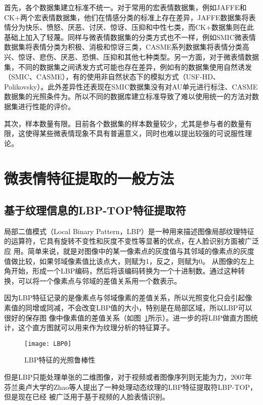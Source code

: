 首先，各个数据集建立标准不统一。对于常用的宏表情数据集，例如JAFFE和CK+两个宏表情数据集，他们在情感分类的标准上存在差异，JAFFE数据集将表情分为快乐、愤怒、厌恶、讨厌、惊讶、压抑和中性七类，而CK+数据集则在此基础上加入了轻蔑。同样与微表情数据集的分类方式也不一样，例如SMIC微表情数据集将表情分类为积极、消极和惊讶三类，CASME系列数据集将表情分类高兴、惊讶、悲伤、厌恶、恐惧、压抑和其他七种类型。另一方面，对于微表情数据集，不同的数据集之间诱发方式可能也存在差异，例如有的数据集使用自然诱发（SMIC、CASME），有的使用非自然状态下的模拟方式（USF-HD、Polikovsky）。此外差异性还表现在SMIC数据集没有对AU单元进行标注、CASME数据集的光照条件为。所以不同的数据库建立标准导致了难以使用统一的方法对数据集进行性能的评价。

其次，样本数量有限。目前各个数据集的样本数量较少，尤其是参与者的数量有限，这使得某些微表情现象不具有普遍意义，同时也难以提出较强的可说服性理论。

\section{微表情特征提取的一般方法}

\subsection{基于纹理信息的LBP-TOP特征提取符}

局部二值模式（Local Binary Pattern，LBP）是一种用来描述图像局部纹理特征的运算符，它具有旋转不变性和灰度不变性等显著的优点，在人脸识别方面被广泛应
用\citep{Ojala2002Gray}。简单来说，就是对图像中的某一像素点的灰度值与其邻域的像素点的灰度值做比较，如果邻域像素值比该点大，则赋为1，反之，则赋为0。
从图像的左上角开始，形成一个LBP编码，然后将该编码转换为一个十进制数。通过这种转换，可以将一个像素点与邻域的差值关系用一个数表示。

因为LBP特征记录的是像素点与邻域像素的差值关系，所以光照变化只会引起像素值的同增或同减，不会改变LBP值的大小，特别是在局部区域，所以LBP可以很好的保存图
像中像素值的差值关系（如图~\ref{fig5}所示）。进一步的将LBP做直方图统计，这个直方图就可以用来作为纹理分析的特征算子。

\begin{figure}[!htbp]
    \centering
    \texttt{[image: LBP0]}
    \caption{LBP特征的光照鲁棒性}
    \label{fig5}
\end{figure}

但是LBP只能处理单张的二维图像，对于视频或者图像序列则无能为力，2007年芬兰奥卢大学的Zhao等人提出了一种处理动态纹理的LBP特征提取符LBP-TOP，但是现在已经
被广泛用于基于视频的人脸表情识别\citep{zhao2007dynamic}。

